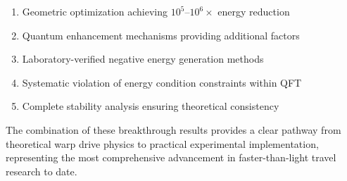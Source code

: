 \documentclass{article}
\begin{document}
\begin{enumerate}
\item Geometric optimization achieving $10^5$--$10^6\times$ energy reduction
\item Quantum enhancement mechanisms providing additional factors
\item Laboratory-verified negative energy generation methods
\item Systematic violation of energy condition constraints within QFT
\item Complete stability analysis ensuring theoretical consistency
\end{enumerate}

The combination of these breakthrough results provides a clear pathway from theoretical warp drive physics to practical experimental implementation, representing the most comprehensive advancement in faster-than-light travel research to date.
\end{document}
